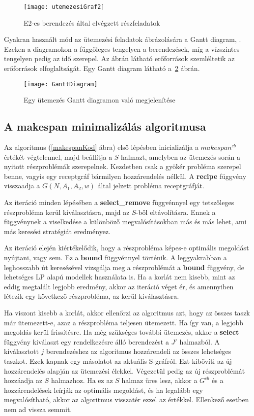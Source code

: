 \begin{figure}[H]
\begin{center}
\texttt{[image: utemezesiGraf2]}
\caption{E2-es berendezés által elvégzett részfeladatok}
\label{utemezesiGraf2}
\end{center}
\end{figure}
Gyakran használt mód az ütemezési feladatok ábrázolására a Gantt diagram\cite{ganttwwf}, \cite{ganttofw}. Ezeken a diagramokon a függőleges tengelyen a berendezések, míg a vízszintes tengelyen pedig az idő szerepel. Az ábrán látható erőforrások szemléltetik az erőforrások elfoglaltságát. Egy Gantt diagram látható a~\ref{GanttDiagram} ábrán.
\begin{figure}[H]
\begin{center}
\texttt{[image: GanttDiagram]}
\caption{Egy ütemezés Gantt diagramon való megjelenítése}
\label{GanttDiagram}
\end{center}
\end{figure}

\subsection{A makespan minimalizálás algoritmusa}
Az algoritmus (\ref{makespanKod} ábra) első lépésben inicializálja a $makespan^{cb}$ értékét végtelennel, majd beállítja a $S$ halmazt, amelyben az ütemezés során a nyitott részproblémák szerepelnek. Kezdetben csak a gyökér probléma szerepel benne, vagyis egy receptgráf bármilyen hozzárendelés nélkül. A \textbf{recipe} függvény visszaadja a $G(N,A_1,A_2,w)$ által jelzett probléma receptgráfját.

Az iteráció minden lépésében a \textbf{select\_remove} függvénnyel egy tetszőleges részprobléma kerül kiválasztásra, majd az $S$-ből eltávolításra. Ennek a függvénynek a viselkedése a különböző megvalósításokban más és más lehet, ami más keresési stratégiát eredményez.

Az iteráció elején kiértékelődik, hogy a részprobléma képes-e optimális megoldást nyújtani, vagy sem. Ez a \textbf{bound} függvénnyel történik. A leggyakrabban a leghosszabb út keresésével vizsgálja meg a részproblémát a \textbf{bound} függvény, de lehetséges LP alapú modellek használata is. Ha a korlát nem kisebb, mint az eddig megtalált legjobb eredmény, akkor az iteráció véget ér, és amennyiben létezik egy következő részprobléma, az kerül kiválasztásra. 

Ha viszont kisebb a korlát, akkor ellenőrzi az algoritmus azt, hogy az összes taszk már ütemezett-e, azaz a részprobléma teljesen ütemezett. Ha így van, a legjobb megoldás kerül frissítésre. Ha még szükséges további ütemezés, akkor a  \textbf{select} függvény kiválaszt egy rendelkezésre álló berendezést a $J'$ halmazból. A kiválasztott $j$ berendezéshez az algoritmus hozzárendeli az összes lehetséges taszkot. Ezek kapnak egy másolatot az aktuális S-gráfról. Ezt kibővíti az új hozzárendelés alapján az ütemezési élekkel. Végezetül pedig az új részproblémát hozzáadja az $S$ halmazhoz. Ha ez az $S$ halmaz üres lesz, akkor a $G^{cb}$ és a hozzárendelések leírják az optimális megoldást, és ha legalább egy megvalósítható, akkor az algoritmus visszatér ezzel az értékkel. Ellenkező esetben nem ad vissza semmit.

